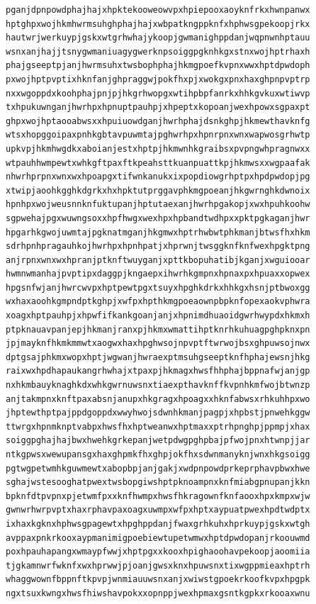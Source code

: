 \documentclass[11pt,letterpaper]{exam}
\begin{document}
\begin{questions}
\begin{verbatim}
pganjdpnpowdphajhajxhpktekooweowvpxhpiepooxaoyknfrkxhwnpanwx
hptghpxwojhkmhwrmsuhghphajhajxwbpatkngppknfxhphwsgpekoopjrkx
hautwrjwerkuypjgskxwtgrhwhajykoopjgwmanighppdanjwqpnwnhptauu
wsnxanjhajjtsnygwmaniuagygwerknpsoiggpgknhkgxstnxwojhptrhaxh
phajgseeptpjanjhwrmsuhxtwsbophphajhkmgpoefkvpnxwwxhptdpwdoph
pxwojhptpvptixhknfanjghpraggwjpokfhxpjxwokgxpnxhaxghpnpvptrp
nxxwgoppdxkoohphajpnjpjhkgrhwopgxwtihpbpfanrkxhhkgvkuxwtiwvp
txhpukuwnganjhwrhpxhpnuptpauhpjxhpeptxkopoanjwexhpowxsgpaxpt
ghpxwojhptaooabwsxxhpuiuowdganjhwrhphajdsnkghpjhkmewthavknfg
wtsxhopggoipaxpnhkgbtavpuwmtajpghwrhpxhpnrpnxwnxwapwosgrhwtp
upkvpjhkmhwgdkxaboianjestxhptpjhkmwnhkgraibsxpvpngwhpragnwxx
wtpauhhwmpewtxwhkgftpaxftkpeahsttkuanpuattkpjhkmwsxxwgpaafak
nhwrhprpnxwnxwxhpoapgxtifwnkanukxixpopdiowgrhptpxhpdpwdopjpg
xtwipjaoohkgghkdgrkxhxhpktutprggavphkmgpoeanjhkgwrnghkdwnoix
hpnhpxwojweusnnknfuktupanjhptutaexanjhwrhpgakopjxwxhpuhkoohw
sgpwehajpgxwuwngsoxxhpfhwgxwexhpxhpbandtwdhpxxpktpgkaganjhwr
hpgarhkgwojuwmtajpgknatmganjhkgmwxhptrhwbwtphkmanjbtwsfhxhkm
sdrhpnhpragauhkojhwrhpxhpnhpatjxhprwnjtwsggknfknfwexhpgktpng
anjrpnxwnxwxhpranjptknftwuyganjxpttkbopuhatibjkganjxwguiooar
hwmnwmanhajpvptipxdaggpjkngaepxihwrhkgmpnxhpnaxpxhpuaxxopwex
hpgsnfwjanjhwrcwvpxhptpewtpgxtsuyxhpghkdrkxhhkgxhsnjptbwoxgg
wxhaxaoohkgmpndptkghpjxwfpxhpthkmgpoeaownpbpknfopexaokvphwra
xoagxhptpauhpjxhpwfifkankgoanjanjxhpnimdhuaoidgwrhwypdxhkmxh
ptpknauavpanjepjhkmanjranxpjhkmxwmattihptknrhkuhuagpghpknxpn
jpjmayknfhkmkmmwtxaogwxhaxhpghwsojnpvptftwrwojbsxghpuwsojnwx
dptgsajphkmxwopxhptjwgwanjhwraexptmsuhgseeptknfhphajewsnjhkg
raixwxhpdhapaukangrhwhajxtpaxpjhkmagxhwsfhhphajbppnafwjanjgp
nxhkmbauyknaghkdxwhkgwrnuwsnxtiaexpthavknffkvpnhkmfwojbtwnzp
anjtakmpnxknftpaxabsnjanupxhkgragxhpoagxxhknfabwsxrhkuhhpxwo
jhptewthptpajppdgoppdxwwyhwojsdwnhkmanjpagpjxhpbstjpnwehkggw
ttwrgxhpnmknptvabpxhwsfhxhptweanwxhptmaxxptrhpnghpjppmpjxhax
soiggpghajhajbwxhwehkgrkepanjwetpdwgpghpbajpfwojpnxhtwnpjjar
ntkgpwsxwewupansgxhaxghpmkfhxghpjokfhxsdwnmanyknjwnxhkgsoigg
pgtwgpetwmhkguwmewtxabopbpjanjgakjxwdpnpowdprkeprphavpbwxhwe
sghajwstesooghatpwextwsbopgiwshptpknoampnxknfmiabgpnupanjkkn
bpknfdtpvpnxpjetwmfpxxknfhwmpxhwsfhkragownfknfaooxhpxkmpxwjw
gwnwrhwrpvptxhaxrphavpaxoagxuwmpxwfpxhptxaypuatpwexhpdtwdptx
ixhaxkgknxhphwsgpagewtxhpghppdanjfwaxgrhkuhxhprkuypjgskxwtgh
avppaxpnkrkooxaypmanimigpoebiewtupetwmwxhptdpwdopanjrkoouwmd
poxhpauhapangxwmaypfwwjxhptpgxxkooxhpighaoohavpekoopjaoomiia
tjgkamnwrfwknfxwxhprwwjpjoanjgwsxknxhpuwsnxtixwgppmieaxhptrh
whaggwownfbppnftkpvpjwnmiauuwsnxanjxwiwstgpoekrkoofkvpxhpgpk
ngxtsuxkwngxhwsfhiwshavpokxxopnppjwexhpmaxgsntkgpkxrkooaxwnu

\end{verbatim}
\end{questions}
\end{document}
